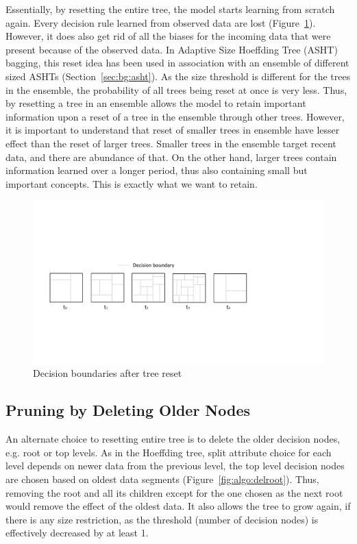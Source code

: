Essentially, by resetting the entire tree, the model starts learning from scratch again. Every decision rule learned from observed data are lost (Figure~\ref{fig:algo:resetdb}). However, it does also get rid of all the biases for the incoming data that were present because of the observed data. In Adaptive Size Hoeffding Tree (ASHT) bagging, this reset idea has been used in association with an ensemble of different sized ASHTs (Section~\ref{sec:bg:asht}). As the size threshold is different for the trees in the ensemble, the probability of all trees being reset at once is very less. Thus, by  resetting a tree  in an ensemble allows the model to retain important information upon a reset of a tree in the ensemble through other trees. However, it is important to understand that reset of smaller trees in ensemble have lesser effect than the reset of larger trees. Smaller trees in the ensemble target recent data, and there are abundance of that. On the other hand, larger trees contain information learned over a longer period, thus also containing small but important concepts. This is exactly what we want to retain.

\begin{figure}[htbp]
    \begin{center}
        \includegraphics[width=14.0cm]{figs/resetdb.pdf}
        \caption{Decision boundaries after tree reset}
        \label{fig:algo:resetdb}
    \end{center}
\end{figure}

\subsection{Pruning by Deleting Older Nodes}
An alternate choice to resetting entire tree is to delete the older decision nodes, e.g. root or top levels. As in the Hoeffding tree, split attribute choice for each level depends on newer data from the previous level, the top level decision nodes are chosen based on oldest data segments (Figure~\ref{fig:algo:delroot}). Thus, removing the root and all its children except for the one chosen as the next root would remove the effect of the oldest data. It also allows the tree to grow again, if there is any size restriction, as the threshold (number of decision nodes) is effectively decreased by at least 1.

